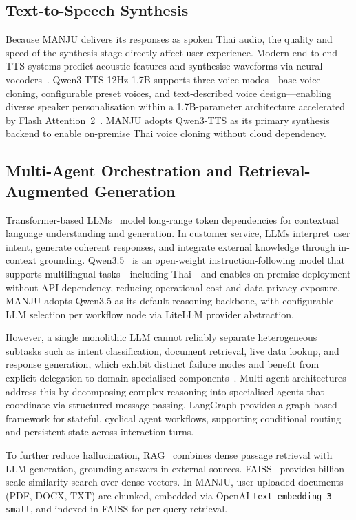 \documentclass[10pt, a4paper, twocolumn]{article}
\begin{document}
\subsection{Text-to-Speech Synthesis}
Because MANJU delivers its responses as spoken Thai audio, the quality and speed of the synthesis stage directly affect user experience.
Modern end-to-end TTS systems predict acoustic features and synthesise waveforms via neural vocoders~\cite{tan2021ttssurvey}.
Qwen3-TTS-12Hz-1.7B supports three voice modes---base voice cloning, configurable preset voices, and text-described voice design---enabling diverse speaker personalisation within a 1.7B-parameter architecture accelerated by Flash Attention~2~\cite{dao2022flashattention}.
MANJU adopts Qwen3-TTS as its primary synthesis backend to enable on-premise Thai voice cloning without cloud dependency.

\subsection{Multi-Agent Orchestration and Retrieval-Augmented Generation}
Transformer-based LLMs~\cite{vaswani2017attention} model long-range token dependencies for contextual language understanding and generation.
In customer service, LLMs interpret user intent, generate coherent responses, and integrate external knowledge through in-context grounding.
Qwen3.5~\cite{qwen2025qwen35} is an open-weight instruction-following model that supports multilingual tasks---including Thai---and enables on-premise deployment without API dependency, reducing operational cost and data-privacy exposure.
MANJU adopts Qwen3.5 as its default reasoning backbone, with configurable LLM selection per workflow node via LiteLLM provider abstraction.

However, a single monolithic LLM cannot reliably separate heterogeneous subtasks such as intent classification, document retrieval, live data lookup, and response generation, which exhibit distinct failure modes and benefit from explicit delegation to domain-specialised components~\cite{langgraph2024}.
Multi-agent architectures address this by decomposing complex reasoning into specialised agents that coordinate via structured message passing.
LangGraph provides a graph-based framework for stateful, cyclical agent workflows, supporting conditional routing and persistent state across interaction turns.

To further reduce hallucination, RAG~\cite{lewis2020rag} combines dense passage retrieval with LLM generation, grounding answers in external sources.
FAISS~\cite{johnson2019faiss} provides billion-scale similarity search over dense vectors.
In MANJU, user-uploaded documents (PDF, DOCX, TXT) are chunked, embedded via OpenAI \texttt{text-embedding-3-small}, and indexed in FAISS for per-query retrieval.
\end{document}
